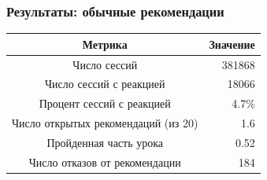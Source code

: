 \documentclass{beamer}
\begin{document}
\begin{frame}\frametitle{Результаты: обычные рекомендации}
\bigskip

\begin{table}[H]
    \begin{tabular}{| c || r| }
      Метрика & Значение \\
      \hline		
      Число сессий & 381868 \\
      Число сессий с реакцией & 18066 \\
      Процент сессий с реакцией &  4.7\% \\
      Число открытых рекомендаций (из 20) & 1.6 \\
      Пройденная часть урока & 0.52 \\
      Число отказов от рекомендации & 184 \\\hline
    \end{tabular}
\end{table}


\begin{figure}[H]
  \centering
  \hfill
\end{figure}

\end{frame}
\end{document}
